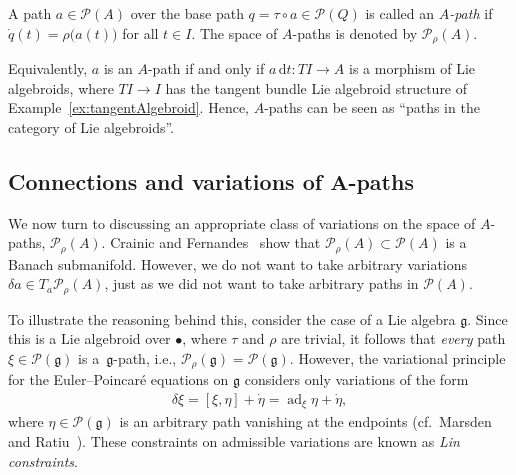 \documentclass[pdftex]{sigma}
\numberwithin{equation}{section}
\begin{document}
\begin{Definition} \label{def:a-path}
A path $ a \in \mathcal{P} (A) $ over the base path $ q = \tau \circ a \in \mathcal{P} (Q) $ is called an \emph{$A$-path} if $ \dot{q} (t) = \rho \bigl( a (t) \bigr) $ for all $ t \in I $. The space of $A$-paths is denoted by $ \mathcal{P} _\rho (A) $.
\end{Definition}

\begin{Remark}
Equivalently, $a$ is an $A$-path if and only if $ a \,\mathrm{d}t \colon T I \rightarrow A $ is a morphism of Lie algebroids, where $ T I \rightarrow I $ has the tangent bundle Lie algebroid structure of Example~\ref{ex:tangentAlgebroid}. Hence, $A$-paths can be seen as ``paths in the category of Lie
 algebroids''.
\end{Remark}

\subsection[Connections and variations of $A$-paths]{Connections and variations of $\boldsymbol{A}$-paths}

We now turn to discussing an appropriate class of variations on the space of $A$-paths, $ \mathcal{P} _\rho (A) $. Crainic and Fernandes~\cite[Lemma~4.6]{CrFe2003} show that $ \mathcal{P} _\rho (A) \subset \mathcal{P} (A) $ is a Banach submanifold. However, we do not want to take arbitrary variations $ \delta a \in T _a \mathcal{P} _\rho (A) $, just as we did not want to take arbitrary paths in $ \mathcal{P} (A) $.

To illustrate the reasoning behind this, consider the case of a Lie algebra $ \mathfrak{g} $. Since this is a Lie algebroid over $ \bullet $, where $\tau$ and $\rho$ are trivial, it follows that \emph{every} path $ \xi \in \mathcal{P} ( \mathfrak{g} ) $ is a~$ \mathfrak{g} $-path, i.e., $ \mathcal{P} _\rho ( \mathfrak{g} ) = \mathcal{P} (\mathfrak{g} )$. However, the variational principle for the Euler--Poincar\'e equations on $ \mathfrak{g} $ considers only variations of the form
\begin{gather*}
 \delta \xi = [ \xi, \eta ] + \dot{ \eta } = \operatorname{ad} _\xi \eta + \dot{ \eta } ,
\end{gather*}
where $ \eta \in \mathcal{P} ( \mathfrak{g} ) $ is an arbitrary path vanishing at the endpoints (cf.\ Marsden and Ratiu~\cite[Chapter~13]{MaRa1999}). These constraints on admissible variations are known as \emph{Lin constraints}.
\end{document}
